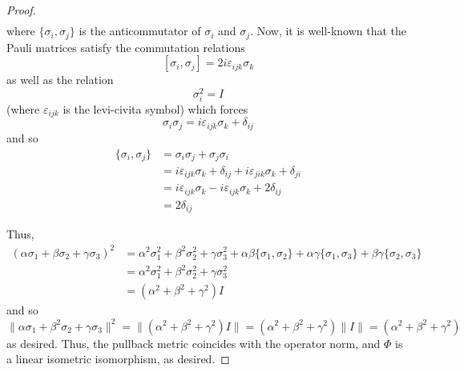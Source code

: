 \documentclass[fontsize=11pt]{scrartcl} %
\numberwithin{equation}{section} %
\numberwithin{figure}{section} %
\numberwithin{table}{section} %
\begin{document}
\begin{proof}
\[\begin{aligned}
\end{aligned}
    \]
    where $\{\sigma_i,\sigma_j\}$ is the anticommutator of $\sigma_i$ and
    $\sigma_j$. Now, it is well-known that the Pauli matrices satisfy the
    commutation relations
    \[
        [\sigma_i,\sigma_j]=2i\varepsilon_{ijk}\sigma_k
    \]
    as well as the relation
    \[
        \sigma_i^2 = I
    \]
    (where $\varepsilon_{ijk}$ is the levi-civita symbol) which forces
    \[
        \sigma_i\sigma_j = i\varepsilon_{ijk}\sigma_k + \delta_{ij}
    \]
    and so
    \[
        \begin{aligned}
        \{\sigma_i,\sigma_j\} &= \sigma_i\sigma_j + \sigma_j\sigma_i\\
        &= i\varepsilon_{ijk}\sigma_k + \delta_{ij} + i\varepsilon_{jik}\sigma_k +
        \delta_{ji}\\
        &= i\varepsilon_{ijk}\sigma_k - i\varepsilon_{ijk}\sigma_k +
        2\delta_{ij}\\
        &= 2\delta_{ij}
    \end{aligned}
    \]

    Thus,
    \[
\begin{aligned}
    (\alpha\sigma_1+\beta\sigma_2+\gamma\sigma_3)^2 &=
    \alpha^2\sigma_1^2 + \beta^2\sigma_2^2  + \gamma\sigma_3^2 +
    \alpha\beta\{\sigma_1,\sigma_2\} + \alpha\gamma\{\sigma_1,\sigma_3\} +
    \beta\gamma\{\sigma_2,\sigma_3\}\\
    &= 
    \alpha^2\sigma_1^2 + \beta^2\sigma_2^2  + \gamma\sigma_3^2\\
    &=(\alpha^2+\beta^2+\gamma^2)I
\end{aligned}
    \]
    and so
    \[
    \|\alpha\sigma_1 + \beta^2\sigma_2 + \gamma\sigma_3\|^2 =
    \|(\alpha^2+\beta^2+\gamma^2)I\| = (\alpha^2+\beta^2+\gamma^2)\|I\|
    =(\alpha^2+\beta^2+\gamma^2)
    \]
    as desired. Thus, the pullback metric coincides with the operator norm, and
    $\Phi$ is a linear isometric isomorphism, as desired.
\end{proof}

\newpage
\end{document}
